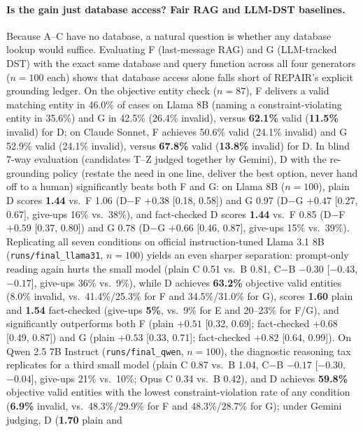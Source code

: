 \documentclass[11pt]{article}
\begin{document}
\paragraph{Is the gain just database access? Fair RAG and LLM-DST baselines.} Because A--C have no database, a
natural question is whether any database lookup would suffice. Evaluating F (last-message RAG) and G
(LLM-tracked DST) with the exact same database and query function across all four generators ($n=100$ each)
shows that database access alone falls short of REPAIR's explicit grounding ledger. On the objective entity
check ($n=87$), F delivers a valid matching entity in 46.0\% of cases on Llama 8B (naming a
constraint-violating entity in 35.6\%) and G in 42.5\% (26.4\% invalid), versus \textbf{62.1\%} valid
(\textbf{11.5\%} invalid) for D; on Claude Sonnet, F achieves 50.6\% valid (24.1\% invalid) and G 52.9\%
valid (24.1\% invalid), versus \textbf{67.8\%} valid (\textbf{13.8\%} invalid) for D. In blind 7-way
evaluation (candidates T--Z judged together by Gemini), D with the re-grounding policy (restate the need in
one line, deliver the best option, never hand off to a human) significantly beats both F and G: on Llama 8B
($n=100$), plain D scores \textbf{1.44} vs.\ F 1.06 (D$-$F $+0.38$ [0.18, 0.58]) and G 0.97 (D$-$G $+0.47$
[0.27, 0.67], give-ups 16\% vs.\ 38\%), and fact-checked D scores \textbf{1.44} vs.\ F 0.85 (D$-$F $+0.59$
[0.37, 0.80]) and G 0.78 (D$-$G $+0.66$ [0.46, 0.87], give-ups 15\% vs.\ 39\%). Replicating all seven
conditions on official instruction-tuned Llama 3.1 8B (\texttt{runs/final\_llama31}, $n=100$) yields an even
sharper separation: prompt-only reading again hurts the small model (plain C 0.51 vs.\ B 0.81, C$-$B $-0.30$
[$-0.43$, $-0.17$], give-ups 36\% vs.\ 9\%), while D achieves \textbf{63.2\%} objective valid entities (8.0\%
invalid, vs.\ 41.4\%/25.3\% for F and 34.5\%/31.0\% for G), scores \textbf{1.60} plain and \textbf{1.54}
fact-checked (give-ups \textbf{5\%}, vs.\ 9\% for E and 20--23\% for F/G), and significantly outperforms both
F (plain $+0.51$ [0.32, 0.69]; fact-checked $+0.68$ [0.49, 0.87]) and G (plain $+0.53$ [0.33, 0.71];
fact-checked $+0.82$ [0.64, 0.99]). On Qwen 2.5 7B Instruct (\texttt{runs/final\_qwen}, $n=100$), the
diagnostic reasoning tax replicates for a third small model (plain C 0.87 vs.\ B 1.04, C$-$B $-0.17$
[$-0.30$, $-0.04$], give-ups 21\% vs.\ 10\%; Opus C 0.34 vs.\ B 0.42), and D achieves \textbf{59.8\%}
objective valid entities with the lowest constraint-violation rate of any condition (\textbf{6.9\%} invalid,
vs.\ 48.3\%/29.9\% for F and 48.3\%/28.7\% for G); under Gemini judging, D (\textbf{1.70} plain and
\end{document}
